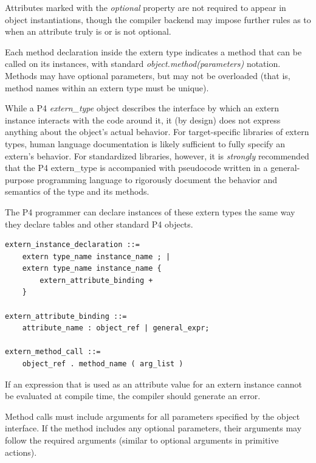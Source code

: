 \documentclass[12pt]{article}
\begin{document}
Attributes marked with the \textit{optional} property are not required to
appear in object instantiations, though the compiler backend may impose further
rules as to when an attribute truly is or is not optional.

Each method declaration inside the extern type indicates a method that can be
called on its instances, with standard \textit{object.method(parameters)} 
notation. Methods may have optional parameters, but may not be overloaded (that
is, method names within an extern type must be unique).

While a P4 \textit{extern_type} object describes the interface by which an
extern instance interacts with the code around it, it (by design) does not
express anything about the object's actual behavior. For target-specific
libraries of extern types, human language documentation is likely sufficient 
to fully specify an extern's behavior. For standardized libraries, however,
it is \textit{strongly} recommended that the P4 extern_type is accompanied
with pseudocode written in a general-purpose programming language to rigorously 
document the behavior and semantics of the type and its methods.


The P4 programmer can declare instances of these extern types the same way they
declare tables and other standard P4 objects.

\begin{lstlisting}[style=BNFstyle]
extern_instance_declaration ::= 
    extern type_name instance_name ; |
    extern type_name instance_name { 
        extern_attribute_binding +
    }

extern_attribute_binding ::=
    attribute_name : object_ref | general_expr;

extern_method_call ::= 
    object_ref . method_name ( arg_list )
\end{lstlisting}

If an expression that is used as an attribute value for an extern
instance cannot be evaluated at compile time, the compiler should
generate an error.

Method calls must include arguments for all parameters specified by the
object interface. If the method includes any optional parameters, their
arguments may follow the required arguments (similar to optional arguments
in primitive actions).


\end{document}
